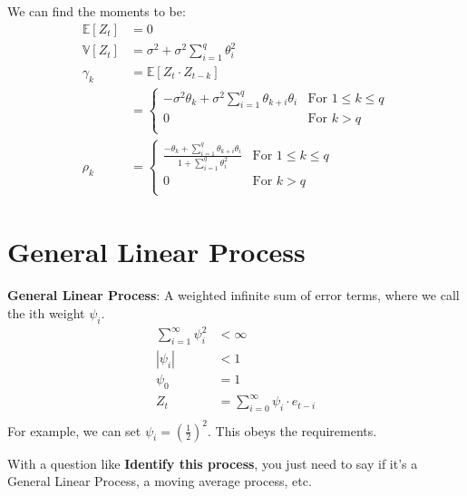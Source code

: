 We can find the moments to be:
\begin{equation*}
    \begin{aligned}
       \mathbb{E}[Z_t] & = 0 \\
       \mathbb{V}[Z_t] & = \sigma^2 + \sigma^2 \sum_{i=1}^{q} \theta^2_i \\
       \gamma_k &= \mathbb{E}[Z_t \cdot Z_{t-k}] \\
           &= \begin{cases}
               -\sigma^2\theta_k + \sigma^2 \sum_{i=1}^{q}
               \theta_{k+i}\theta_i &  \text{For $1 \le k \le q$} \\
               0 & \text{For $k > q$} \\
           \end{cases} \\
        \rho_k &= \begin{cases}
            \frac{
                -\theta_k + \sum_{i=1}^{q} \theta_{k+i}\theta_i
            }{
                1 + \sum_{i=1}^{q} \theta_i^2
            } &  \text{For $1 \le k \le q$} \\
               0 & \text{For $k > q$} \\
            \end{cases}
    \end{aligned}
\end{equation*}

\section{General Linear Process}
\textbf{General Linear Process}: A weighted infinite sum of error terms, where
we call the ith weight $\psi_i$.
\begin{equation*}
    \begin{aligned}
        \sum_{i=1}^{\infty} \psi_i^2 &< \infty \\
        |\psi_i| &< 1 \\
        \psi_0 &= 1 \\
        Z_t &= \sum_{i=0}^{\infty} \psi_i \cdot e_{t-i} \\
    \end{aligned}
\end{equation*}
For example, we can set $\psi_i = (\frac{1}{2})^2$. This obeys the
requirements.

With a question like \textbf{Identify this process}, you just need to say if
it's a General Linear Process, a moving average process, etc.

